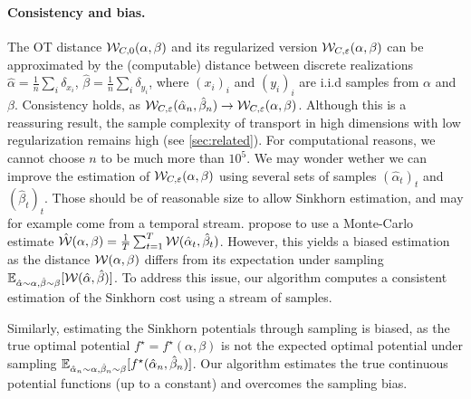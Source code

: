 \paragraph{Consistency and bias.}\label{sec:gradient}

The OT distance $\mathcal{W}_{C,0}(\alpha,\beta)$ and its regularized version
$\mathcal{W}_{C,\varepsilon}(\alpha,\beta)$ can be approximated by the (computable)
distance between discrete realizations $\hat \alpha = \frac{1}{n} \sum_i
\delta_{x_i}$, $\hat \beta = \frac{1}{n} \sum_i \delta_{y_i}$, where ${(x_i)}_i$
and ${(y_i)}_i$ are i.i.d samples from $\alpha$ and $\beta$.  Consistency holds,
as $\mathcal{W}_{C,\varepsilon}(\hat \alpha_n, \hat \beta_n) \to \mathcal{W}_{C,\varepsilon}(\alpha,
\beta)$. Although this is a reassuring result, the sample complexity of
transport in high dimensions with low regularization remains high (see
\autoref{sec:related}). For computational reasons, we cannot choose $n$ to be
much more than $10^5$. We may wonder wether we can improve the estimation of
$\mathcal{W}_{C,\varepsilon}(\alpha,\beta)$ using several sets of samples $(\hat
\alpha_t)_t$ and ${(\hat \beta_t)}_t$. Those should be of reasonable size to
allow Sinkhorn estimation, and may for example come from a temporal stream.
\citet{2018-Genevay-aistats} propose to use a Monte-Carlo estimate $\hat
{\mathcal{W}}(\alpha, \beta) = \frac{1}{T} \sum_{t=1}^T \mathcal{W}(\hat \alpha_t, \hat \beta_t)$.
However, this yields a biased estimation as the distance $\mathcal{W}(\alpha,
\beta)$ differs from its expectation under sampling $\mathbb{E}_{\hat \alpha \sim
\alpha, \hat \beta \sim \beta} [\mathcal{W}(\hat \alpha, \hat \beta)]$. To address this
issue, our algorithm computes a consistent estimation of the Sinkhorn cost
using a stream of samples.

Similarly, estimating the Sinkhorn potentials through sampling is biased, as
the true optimal potential $f^\star=f^\star(\alpha, \beta)$ is not the expected
optimal potential under sampling $\mathbb{E}_{\hat \alpha_n \sim \alpha, \hat \beta_n
\sim \beta}[f^\star(\hat \alpha_n, \hat \beta_n)]$. Our algorithm estimates the
true continuous potential functions (up to a constant) and overcomes the sampling
bias.